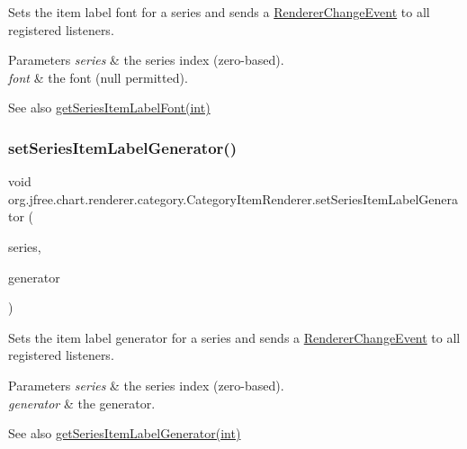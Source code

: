 Sets the item label font for a series and sends a \mbox{\hyperlink{}{Renderer\+Change\+Event}} to all registered listeners.


\begin{DoxyParams}{Parameters}
{\em series} & the series index (zero-\/based). \\
\hline
{\em font} & the font ({\ttfamily null} permitted).\\
\hline
\end{DoxyParams}
\begin{DoxySeeAlso}{See also}
\mbox{\hyperlink{interfaceorg_1_1jfree_1_1chart_1_1renderer_1_1category_1_1_category_item_renderer_a7e2dd43c2b47d951c69a365266cdc281}{get\+Series\+Item\+Label\+Font(int)}} 
\end{DoxySeeAlso}
\mbox{\label{interfaceorg_1_1jfree_1_1chart_1_1renderer_1_1category_1_1_category_item_renderer_a7d50a8f4cf465adb170d97a905f5160c}} 
\subsubsection{\texorpdfstring{set\+Series\+Item\+Label\+Generator()}{setSeriesItemLabelGenerator()}}
{\footnotesize\ttfamily void org.\+jfree.\+chart.\+renderer.\+category.\+Category\+Item\+Renderer.\+set\+Series\+Item\+Label\+Generator (\begin{DoxyParamCaption}\item[{int}]{series,  }\item[{\mbox{\hyperlink{interfaceorg_1_1jfree_1_1chart_1_1labels_1_1_category_item_label_generator}{Category\+Item\+Label\+Generator}}}]{generator }\end{DoxyParamCaption})}

Sets the item label generator for a series and sends a \mbox{\hyperlink{}{Renderer\+Change\+Event}} to all registered listeners.


\begin{DoxyParams}{Parameters}
{\em series} & the series index (zero-\/based). \\
\hline
{\em generator} & the generator.\\
\hline
\end{DoxyParams}
\begin{DoxySeeAlso}{See also}
\mbox{\hyperlink{interfaceorg_1_1jfree_1_1chart_1_1renderer_1_1category_1_1_category_item_renderer_a39fd0df143abb1baf56ba931552a3047}{get\+Series\+Item\+Label\+Generator(int)}} 
\end{DoxySeeAlso}


